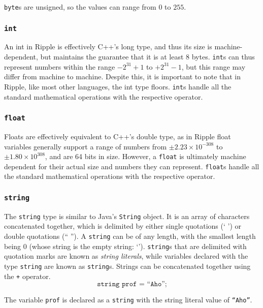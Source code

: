 \documentclass{article}
\newcommand{\code}{\texttt}
\begin{document}
\code{byte}s are unsigned, so the values can range from $0$ to $255$.

\subsubsection{\code{int}}
An int in Ripple is effectively C++'s long type, and thus its size is machine-dependent, but maintains the guarantee that it is at least 8 bytes. \code{int}s can thus represent numbers within the range $-2^{31}+1$ to $+2^{31}-1$, but this range may differ from machine to machine. Despite this, it is important to note that in Ripple, like most other languages, the int type floors. \code{int}s handle all the standard mathematical operations with the respective operator.

\subsubsection{\code{float}}
Floats are effectively equivalent to C++'s double type, as in Ripple float variables generally support a range of numbers from $\pm 2.23 \times 10^{-308}$ to $\pm 1.80 \times 10^{308}$, and are 64 bits in size. However, a \code{float} is ultimately machine dependent for their actual size and numbers they can represent. \code{float}s handle all the standard mathematical operations with the respective operator.

\subsubsection{\code{string}}
The \code{string} type is similar to Java's \code{String} object. It is an array of characters concatenated together, which is delimited by either single quotations (` ') or double quotations (`` ''). A \code{string} can be of any length, with the smallest length being 0 (whose string is the empty string: `'). \code{string}s that are delimited with quotation marks are known as \emph{string literals}, while variables declared with the type \code{string} are known as \code{string}s. Strings can be concatenated together using the \code{+} operator.
\[ \code{string prof = ``Aho'';} \]

The variable \code{prof} is declared as a \code{string} with the string literal value of \code{``Aho''}.
\end{document}
